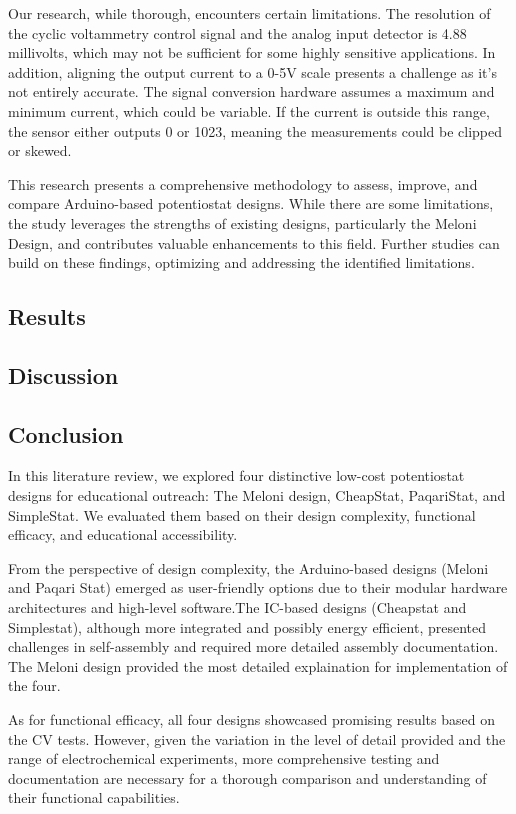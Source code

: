 \documentclass{article}
\begin{document}
Our research, while thorough, encounters certain limitations. The resolution of the cyclic voltammetry control signal and the analog input detector is 4.88 millivolts, which may not be sufficient for some highly sensitive applications. In addition, aligning the output current to a 0-5V scale presents a challenge as it's not entirely accurate. The signal conversion hardware assumes a maximum and minimum current, which could be variable. If the current is outside this range, the sensor either outputs 0 or 1023, meaning the measurements could be clipped or skewed.

This research presents a comprehensive methodology to assess, improve, and compare Arduino-based potentiostat designs. While there are some limitations, the study leverages the strengths of existing designs, particularly the Meloni Design, and contributes valuable enhancements to this field. Further studies can build on these findings, optimizing and addressing the identified limitations.

\subsection*{Results}
\subsection*{Discussion}
\subsection*{Conclusion}

In this literature review, we explored four distinctive low-cost potentiostat designs for educational outreach: The Meloni design, CheapStat, PaqariStat, and SimpleStat. We evaluated them based on their design complexity, functional efficacy, and educational accessibility.

From the perspective of design complexity, the Arduino-based designs (Meloni and Paqari Stat) emerged as user-friendly options due to their modular hardware architectures and high-level software.The IC-based designs (Cheapstat and Simplestat), although more integrated and possibly energy efficient, presented challenges in self-assembly and required more detailed assembly documentation. The Meloni design provided the most detailed explaination for implementation of the four. 

As for functional efficacy, all four designs showcased promising results based on the CV tests. However, given the variation in the level of detail provided and the range of electrochemical experiments, more comprehensive testing and documentation are necessary for a thorough comparison and understanding of their functional capabilities.
\end{document}
